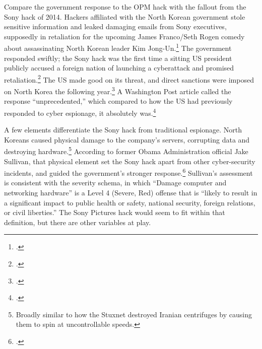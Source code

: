 \documentclass[11pt]{memoir}
\begin{document}
\begin{refsegment}

Compare the government response to the OPM hack with the fallout from the Sony hack of 2014. Hackers affiliated with the North Korean government stole sensitive information and leaked damaging emails from Sony executives, supposedly in retaliation for the upcoming James Franco/Seth Rogen comedy about assassinating North Korean leader Kim Jong-Un.\footcite{barnes_sony_2017} The government responded swiftly; the Sony hack was the first time a sitting US president publicly accused a foreign nation of launching a cyberattack and promised retaliation.\footcite{sanger_u.s._2016} The US made good on its threat, and direct sanctions were imposed on North Korea the following year.\footcite{lederman_us_2015} A Washington Post article called the response ``unprecedented,'' which compared to how the US had previously responded to cyber espionage, it absolutely was.\footcite{nakashima_why_2015}

A few elements differentiate the Sony hack from traditional espionage. North Koreans caused physical damage to the company's servers, corrupting data and destroying hardware.\footnote{Broadly similar to how the Stuxnet destroyed Iranian centrifuges by causing them to spin at uncontrollable speeds.} According to former Obama Administration official Jake Sullivan, that physical element set the Sony hack apart from other cyber-security incidents, and guided the government's stronger response.\footcite[Jake Sullivan served as the Deputy Assistant to the President and National Security Advisor to the Vice President. Piror to that, he was the Director of Policy Planning at the State Department.]{sullivan_personal_2019} Sullivan's assessment is consistent with the severity schema, in which ``Damage computer and networking hardware'' is a Level 4 (Severe, Red) offense that is ``likely to result in a significant impact to public health or safety, national security, foreign relations, or civil liberties.'' The Sony Pictures hack would seem to fit within that definition, but there are other variables at play.


\end{refsegment}
\end{document}

